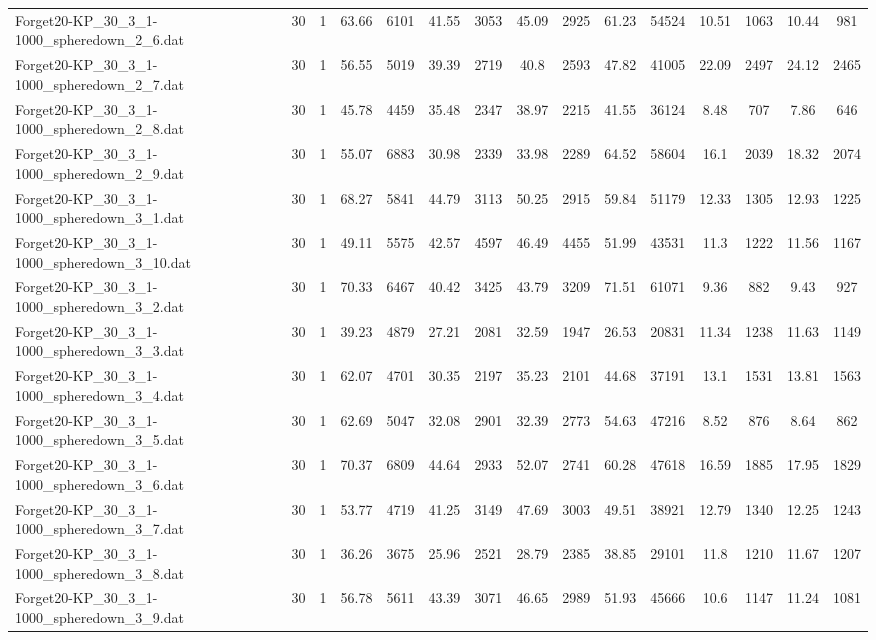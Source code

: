 \begin{table}[!ht]
{\begin{tabular}{lcccccccccccccc}
Forget20-KP\_30\_3\_1-1000\_spheredown\_2\_6.dat & 30 & 1 & 63.66 & 6101 & 41.55 & 3053 & 45.09 & 2925 & 61.23 & 54524 & 10.51 & 1063 & 10.44 & 981 \\
Forget20-KP\_30\_3\_1-1000\_spheredown\_2\_7.dat & 30 & 1 & 56.55 & 5019 & 39.39 & 2719 & 40.8 & 2593 & 47.82 & 41005 & 22.09 & 2497 & 24.12 & 2465 \\
Forget20-KP\_30\_3\_1-1000\_spheredown\_2\_8.dat & 30 & 1 & 45.78 & 4459 & 35.48 & 2347 & 38.97 & 2215 & 41.55 & 36124 & 8.48 & 707 & 7.86 & 646 \\
Forget20-KP\_30\_3\_1-1000\_spheredown\_2\_9.dat & 30 & 1 & 55.07 & 6883 & 30.98 & 2339 & 33.98 & 2289 & 64.52 & 58604 & 16.1 & 2039 & 18.32 & 2074 \\
Forget20-KP\_30\_3\_1-1000\_spheredown\_3\_1.dat & 30 & 1 & 68.27 & 5841 & 44.79 & 3113 & 50.25 & 2915 & 59.84 & 51179 & 12.33 & 1305 & 12.93 & 1225 \\
Forget20-KP\_30\_3\_1-1000\_spheredown\_3\_10.dat & 30 & 1 & 49.11 & 5575 & 42.57 & 4597 & 46.49 & 4455 & 51.99 & 43531 & 11.3 & 1222 & 11.56 & 1167 \\
Forget20-KP\_30\_3\_1-1000\_spheredown\_3\_2.dat & 30 & 1 & 70.33 & 6467 & 40.42 & 3425 & 43.79 & 3209 & 71.51 & 61071 & 9.36 & 882 & 9.43 & 927 \\
Forget20-KP\_30\_3\_1-1000\_spheredown\_3\_3.dat & 30 & 1 & 39.23 & 4879 & 27.21 & 2081 & 32.59 & 1947 & 26.53 & 20831 & 11.34 & 1238 & 11.63 & 1149 \\
Forget20-KP\_30\_3\_1-1000\_spheredown\_3\_4.dat & 30 & 1 & 62.07 & 4701 & 30.35 & 2197 & 35.23 & 2101 & 44.68 & 37191 & 13.1 & 1531 & 13.81 & 1563 \\
Forget20-KP\_30\_3\_1-1000\_spheredown\_3\_5.dat & 30 & 1 & 62.69 & 5047 & 32.08 & 2901 & 32.39 & 2773 & 54.63 & 47216 & 8.52 & 876 & 8.64 & 862 \\
Forget20-KP\_30\_3\_1-1000\_spheredown\_3\_6.dat & 30 & 1 & 70.37 & 6809 & 44.64 & 2933 & 52.07 & 2741 & 60.28 & 47618 & 16.59 & 1885 & 17.95 & 1829 \\
Forget20-KP\_30\_3\_1-1000\_spheredown\_3\_7.dat & 30 & 1 & 53.77 & 4719 & 41.25 & 3149 & 47.69 & 3003 & 49.51 & 38921 & 12.79 & 1340 & 12.25 & 1243 \\
Forget20-KP\_30\_3\_1-1000\_spheredown\_3\_8.dat & 30 & 1 & 36.26 & 3675 & 25.96 & 2521 & 28.79 & 2385 & 38.85 & 29101 & 11.8 & 1210 & 11.67 & 1207 \\
Forget20-KP\_30\_3\_1-1000\_spheredown\_3\_9.dat & 30 & 1 & 56.78 & 5611 & 43.39 & 3071 & 46.65 & 2989 & 51.93 & 45666 & 10.6 & 1147 & 11.24 & 1081 \\

\end{tabular}}
\end{table}
